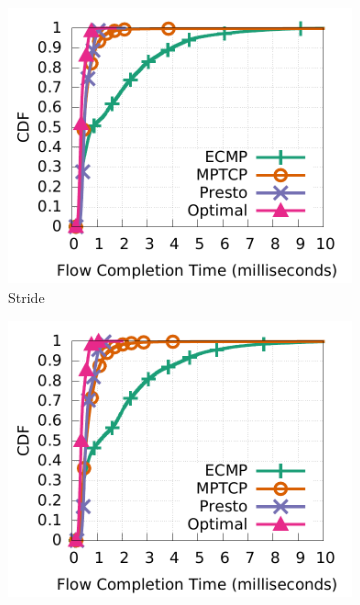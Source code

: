 \begin{figure}[!t]
        \centering
	\begin{subfigure}[b]{0.3\textwidth}
                \centering
  		\includegraphics[width=\textwidth]{presto/figures/macro/stride/macro_compare_fct_stride_mice.pdf}
        	\caption{Stride}
        	\label{macro_evaluation_fct_stride}
	\end{subfigure}
	\begin{subfigure}[b]{0.3\textwidth}
                \centering
		\includegraphics[width=\textwidth]{presto/figures/macro/bijection/macro_compare_fct_bijection_mice.pdf}

\end{subfigure}
\end{figure}
